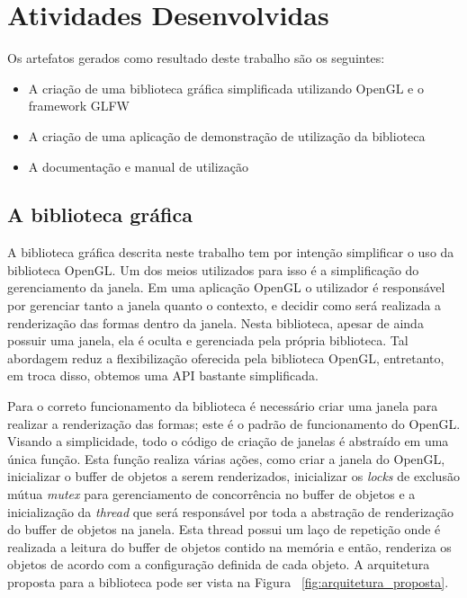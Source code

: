 \documentclass[12pt, %
openright,
oneside, %
a4paper,    %
brazil]{facom-ufu-abntex2}
\begin{document}
\section{Atividades Desenvolvidas}
Os artefatos gerados como resultado deste trabalho são os seguintes:

\begin{itemize}
    \item A criação de uma biblioteca gráfica simplificada utilizando OpenGL e o framework GLFW
    \item A criação de uma aplicação de demonstração de utilização da biblioteca
    \item A documentação e manual de utilização
\end{itemize}

\subsection{A biblioteca gráfica}
A biblioteca gráfica descrita neste trabalho tem por intenção simplificar o uso da biblioteca OpenGL. Um dos meios utilizados para isso é a simplificação do gerenciamento da janela. Em uma aplicação OpenGL o utilizador é responsável por gerenciar tanto a janela quanto o contexto, e decidir como será realizada a renderização das formas dentro da janela. Nesta biblioteca, apesar de ainda possuir uma janela, ela é oculta e gerenciada pela própria biblioteca. Tal abordagem reduz a flexibilização oferecida pela biblioteca OpenGL, entretanto, em troca disso, obtemos uma API bastante simplificada.

Para o correto funcionamento da biblioteca é necessário criar uma janela para realizar a renderização das formas; este é o padrão de funcionamento do OpenGL. Visando a simplicidade, todo o código de criação de janelas é abstraído em uma única função. Esta função realiza várias ações, como criar a janela do OpenGL, inicializar o buffer de objetos a serem renderizados, inicializar os \textit{locks} de exclusão mútua \textit{mutex} para gerenciamento de concorrência no buffer de objetos e a inicialização da \textit{thread} que será responsável por toda a abstração de renderização do buffer de objetos na janela. Esta thread possui um laço de repetição onde é realizada a leitura do buffer de objetos contido na memória e então, renderiza os objetos de acordo com a configuração definida de cada objeto. A arquitetura proposta para a biblioteca pode ser vista na Figura ~\ref{fig:arquitetura_proposta}.
\end{document}
